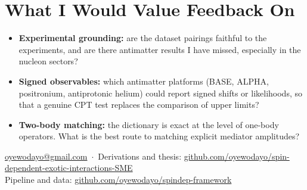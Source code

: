 \documentclass[10pt,a4paper]{article}
\begin{document}
\section*{What I Would Value Feedback On}
\begin{itemize}
  \item \textbf{Experimental grounding:} are the dataset pairings faithful to
    the experiments, and are there antimatter results I have missed,
    especially in the nucleon sectors?
  \item \textbf{Signed observables:} which antimatter platforms (BASE, ALPHA,
    positronium, antiprotonic helium) could report signed shifts or
    likelihoods, so that a genuine CPT test replaces the comparison of upper
    limits?
  \item \textbf{Two-body matching:} the dictionary is exact at the level of
    one-body operators. What is the best route to matching explicit mediator
    amplitudes?
\end{itemize}

\vfill
\begin{center}
  {\footnotesize\color{muted}
  \href{mailto:oyewodayo@gmail.com}{oyewodayo@gmail.com} \,$\cdot$\,
  Derivations and thesis:
  \href{https://github.com/oyewodayo/spin-dependent-exotic-interactions-SME}{github.com/oyewodayo/spin-dependent-exotic-interactions-SME}\\[1pt]
  Pipeline and data:
  \href{https://github.com/oyewodayo/spindep-framework}{github.com/oyewodayo/spindep-framework}\par}
\end{center}
\end{document}
